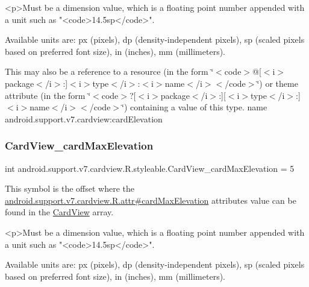 \begin{DoxyVerb}      <p>Must be a dimension value, which is a floating point number appended with a unit such as "<code>14.5sp</code>".
\end{DoxyVerb}
 Available units are\+: px (pixels), dp (density-\/independent pixels), sp (scaled pixels based on preferred font size), in (inches), mm (millimeters). 

This may also be a reference to a resource (in the form \char`\"{}$<$code$>$@\mbox{[}$<$i$>$package$<$/i$>$\+:\mbox{]}$<$i$>$type$<$/i$>$\+:$<$i$>$name$<$/i$>$$<$/code$>$\char`\"{}) or theme attribute (in the form \char`\"{}$<$code$>$?\mbox{[}$<$i$>$package$<$/i$>$\+:\mbox{]}\mbox{[}$<$i$>$type$<$/i$>$\+:\mbox{]}$<$i$>$name$<$/i$>$$<$/code$>$\char`\"{}) containing a value of this type.  name android.\+support.\+v7.\+cardview\+:card\+Elevation \mbox{\label{classandroid_1_1support_1_1v7_1_1cardview_1_1R_1_1styleable_a07d7edea3f37f66423d90bc58c1bc837}} 
\subsubsection{\texorpdfstring{Card\+View\+\_\+card\+Max\+Elevation}{CardView\_cardMaxElevation}}
{\footnotesize\ttfamily int android.\+support.\+v7.\+cardview.\+R.\+styleable.\+Card\+View\+\_\+card\+Max\+Elevation = 5\hspace{0.3cm}{\ttfamily [static]}}

This symbol is the offset where the \hyperlink{classandroid_1_1support_1_1v7_1_1cardview_1_1R_1_1attr_a2176e51c58a1dfdee83e66e3f956d643}{android.\+support.\+v7.\+cardview.\+R.\+attr\#card\+Max\+Elevation} attribute\textquotesingle{}s value can be found in the \hyperlink{classandroid_1_1support_1_1v7_1_1cardview_1_1R_1_1styleable_ad08b98a07471f174f404c58941fc82ca}{Card\+View} array.

\begin{DoxyVerb}      <p>Must be a dimension value, which is a floating point number appended with a unit such as "<code>14.5sp</code>".
\end{DoxyVerb}
 Available units are\+: px (pixels), dp (density-\/independent pixels), sp (scaled pixels based on preferred font size), in (inches), mm (millimeters). 

